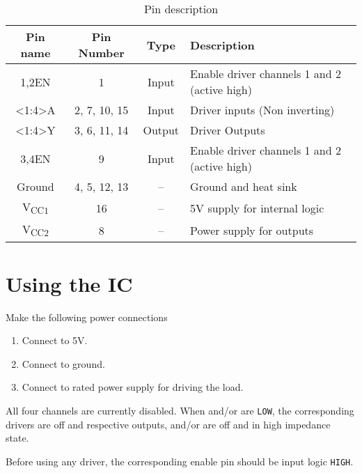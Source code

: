 \documentclass{article}
\begin{document}
	\begin{table}[h]
	\large
	\caption{Pin description}
		\begin{center}
		\begin{tabular}{|c|c|c|l|}
			\hline
			Pin name & Pin Number & Type & Description \\ \hline \hline
			1,2EN & 1 & Input & Enable driver channels 1 and 2 (active high) \\ \hline
			\textless{}1:4\textgreater{}A & 2, 7, 10, 15 & Input & Driver inputs (Non inverting) \\ \hline
			\textless{}1:4\textgreater{}Y & 3, 6, 11, 14 & Output & Driver Outputs \\ \hline
			3,4EN & 9 & Input & Enable driver channels 1 and 2 (active high) \\ \hline
			Ground & 4, 5, 12, 13 & -- & Ground and heat sink \\ \hline
			V\textsubscript{CC1} & 16 & -- & 5V supply for internal logic \\ \hline
			V\textsubscript{CC2} & 8 & -- & Power supply for outputs \\ \hline
		\end{tabular}
		\end{center}
	\end{table}

\newpage

\section{Using the IC}

	Make the following power connections

	\begin{enumerate}
		\item Connect  to 5V.
		\item Connect  to ground.
		\item Connect  to rated power supply for driving the load.
	\end{enumerate}

	All four channels are currently disabled. When  and/or  are \texttt{LOW}, the corresponding drivers are off and respective outputs,  and/or  are off and in high impedance state.

	Before using any driver, the corresponding enable pin should  be input logic \texttt{HIGH}.
\end{document}
